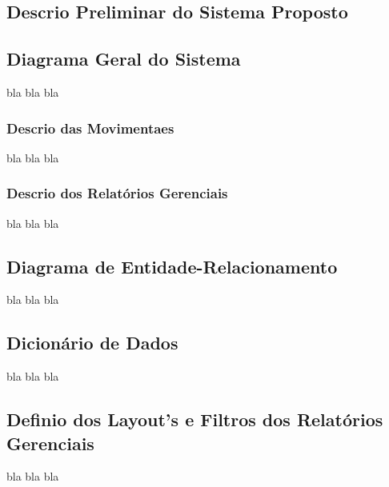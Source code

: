 \begin{titlepage}
\chapter{Descri\ca o Preliminar do Sistema Proposto}
\section{Diagrama Geral do Sistema}
bla bla bla
\subsection{Descri\ca o das Movimenta\co es}
bla bla bla
\subsection{Descri\ca o dos Relat\'orios Gerenciais}
bla bla bla
\section{Diagrama de Entidade-Relacionamento}
bla bla bla
\section{Dicion\'ario de Dados}
bla bla bla
\section{Defini\ca o dos Layout's e Filtros dos Relat\'orios Gerenciais}
bla bla bla
\end{titlepage}
